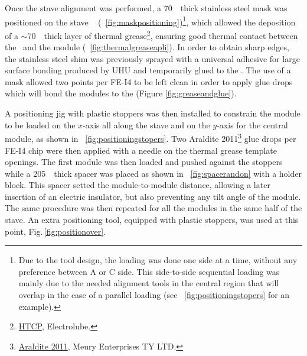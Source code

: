 Once the stave alignment was performed, a 70~\microm\ thick stainless steel mask was positioned on the stave \faceplate\
 (~\ref{fig:maskpositioning})\footnote{Due to the tool design, the loading was done one side at a time, without any preference between A or C side. This side-to-side sequential loading was mainly due to the needed alignment tools in the central region that will overlap in the case of a parallel loading (see \reffigure~\ref{fig:positioningstopers} for an example).}, which allowed the deposition of a $\sim$70~\microm\ thick layer of thermal grease\footnote{\href{http://www.electrolube.com/products/thermal-management/91/16/}{HTCP}, Electrolube.}, ensuring good thermal contact between the \faceplate\ and the module (~\ref{fig:thermalgreaseapli}). In order to obtain sharp edges, the stainless steel shim was previously sprayed with a universal adhesive for large surface bonding produced by UHU and temporarily glued to the \faceplate. %
The use of a mask allowed two points per FE-I4 to be left clean in order to apply glue drops which will bond the modules to the \faceplate (Figure \ref{fig:greaseandglue}).
 
A positioning jig with plastic stoppers was then installed to constrain the module to be loaded on the $x$-axis all along the stave and on the $y$-axis for the central module, as shown in ~\ref{fig:positioningstopers}. Two Araldite 2011\footnote{\href{http://www.meury.com.au/ProductDisplay.asp?PID=48}{Araldite 2011}, Meury Enterprises TY LTD.} glue drops per FE-I4 chip were then applied with a needle on the thermal grease template openings. The first module was then loaded and pushed against the stoppers while a 205~\microm\ thick spacer was placed as shown in ~\ref{fig:spacerandon} with a holder block. This spacer setted the module-to-module distance, allowing a later insertion of an electric insulator, but also preventing any tilt angle of the module. The same procedure was then repeated for all the modules in the same half of the stave. An extra positioning tool, equipped  with plastic stoppers, was used at this point, Fig.\,\ref{fig:positionover}.

